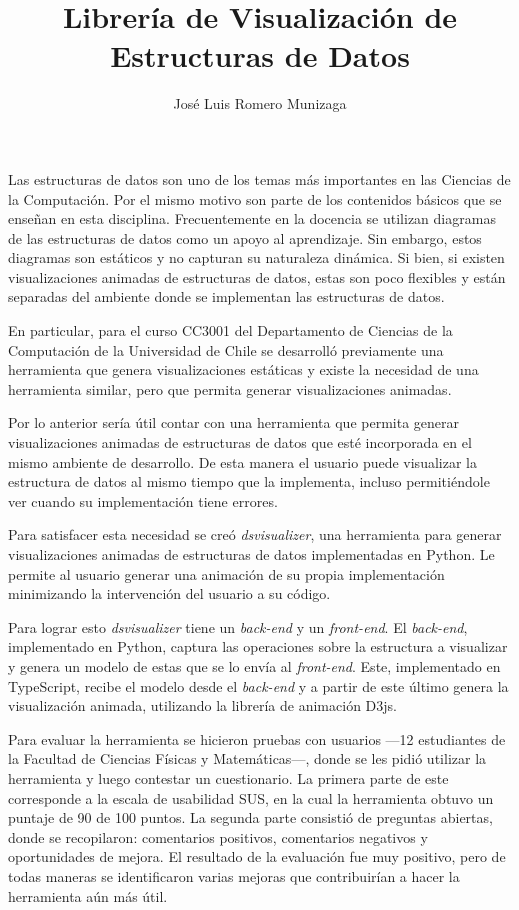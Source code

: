 \documentclass{umemoria}
\author{José Luis Romero Munizaga}
\title{Librería de Visualización de Estructuras de Datos}
\begin{document}
\frontmatter
\maketitle

\begin{resumen}
Las estructuras de datos son uno de los temas más importantes en las Ciencias de la Computación.
Por el mismo motivo son parte de los contenidos básicos que se enseñan en esta disciplina.
Frecuentemente en la docencia se utilizan diagramas de las estructuras de datos como un apoyo al aprendizaje.
Sin embargo, estos diagramas son estáticos y no capturan su naturaleza dinámica.
Si bien, si existen visualizaciones animadas de estructuras de datos, estas son poco flexibles y están separadas del ambiente donde se implementan las estructuras de datos.

En particular, para el curso CC3001 del Departamento de Ciencias de la Computación de la Universidad de Chile se desarrolló previamente una herramienta que genera visualizaciones estáticas y existe la necesidad de una herramienta similar, pero que permita generar visualizaciones animadas.

Por lo anterior sería útil contar con una herramienta que permita generar visualizaciones animadas de estructuras de datos que esté incorporada en el mismo ambiente de desarrollo.
De esta manera el usuario puede visualizar la estructura de datos al mismo tiempo que la implementa, incluso permitiéndole ver cuando su implementación tiene errores.

Para satisfacer esta necesidad se creó \textit{dsvisualizer}, una herramienta para generar visualizaciones animadas de estructuras de datos implementadas en Python.
Le permite al usuario generar una animación de su propia implementación minimizando la intervención del usuario a su código.

Para lograr esto \textit{dsvisualizer} tiene un \textit{back-end} y un \textit{front-end}. El \textit{back-end}, implementado en Python, captura las operaciones sobre la estructura a visualizar y genera un modelo de estas que se lo envía al \textit{front-end}. Este, implementado en TypeScript, recibe el modelo desde el \textit{back-end} y a partir de este último genera la visualización animada, utilizando la librería de animación D3js.

Para evaluar la herramienta se hicieron pruebas con usuarios ---12 estudiantes de la Facultad de Ciencias Físicas y Matemáticas---, donde se les pidió utilizar la herramienta y luego contestar un cuestionario. La primera parte de este corresponde a la escala de usabilidad SUS, en la cual la herramienta obtuvo un puntaje de 90 de 100 puntos. La segunda parte consistió de preguntas abiertas, donde se recopilaron: comentarios positivos, comentarios negativos y oportunidades de mejora. El resultado de la evaluación fue muy positivo, pero de todas maneras se identificaron varias mejoras que contribuirían a hacer la herramienta aún más útil.
\end{resumen}
\end{document}
